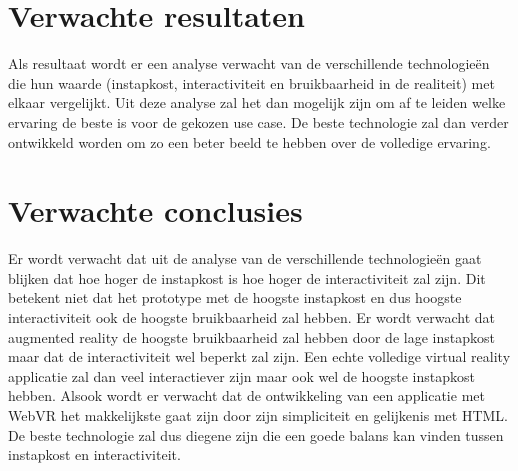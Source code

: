 \section{Verwachte resultaten}
\label{sec:verwachte_resultaten}

Als resultaat wordt er een analyse verwacht van de verschillende technologieën die hun waarde (instapkost, interactiviteit en bruikbaarheid in de realiteit) met elkaar vergelijkt. Uit deze analyse zal het dan mogelijk zijn om af te leiden welke ervaring de beste is voor de gekozen use case. De beste technologie zal dan verder ontwikkeld worden om zo een beter beeld te hebben over de volledige ervaring.

\section{Verwachte conclusies}
\label{sec:verwachte_conclusies}

Er wordt verwacht dat uit de analyse van de verschillende technologieën gaat blijken dat hoe hoger de instapkost is hoe hoger de interactiviteit zal zijn. Dit betekent niet dat het prototype met de hoogste instapkost en dus hoogste interactiviteit ook de hoogste bruikbaarheid zal hebben. Er wordt verwacht dat augmented reality de hoogste bruikbaarheid zal hebben door de lage instapkost maar dat de interactiviteit wel beperkt zal zijn. Een echte volledige virtual reality applicatie zal dan veel interactiever zijn maar ook wel de hoogste instapkost hebben. Alsook wordt er verwacht dat de ontwikkeling van een applicatie met WebVR het makkelijkste gaat zijn door zijn simpliciteit en gelijkenis met HTML. De beste technologie zal dus diegene zijn die een goede balans kan vinden tussen instapkost en interactiviteit.

